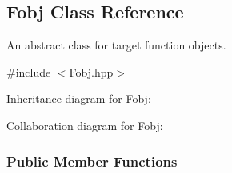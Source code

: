 \hypertarget{classFobj}{\subsection{\-Fobj \-Class \-Reference}
\label{classFobj}
}


\-An abstract class for target function objects.  




{\ttfamily \#include $<$\-Fobj.\-hpp$>$}



\-Inheritance diagram for \-Fobj\-:


\-Collaboration diagram for \-Fobj\-:
\subsubsection*{\-Public \-Member \-Functions}

